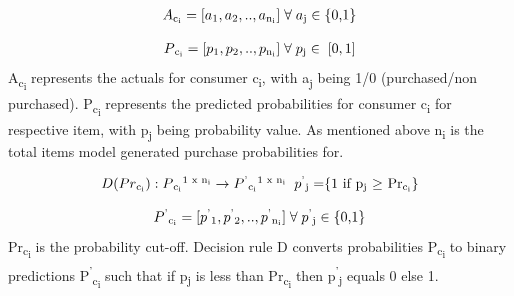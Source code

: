   \begin{equation}
    \begin{array}{l}
      A\textsubscript{c\textsubscript{i}} = [a\textsubscript{1}, a\textsubscript{2}, .., a\textsubscript{n\textsubscript{i}}] 
       \; \forall \; a\textsubscript{j} \in \; $\{0,1\}$
    \end{array}
    \label{eqn:A}
  \end{equation}

  \begin{equation}
    \begin{array}{l}
      P\textsubscript{c\textsubscript{i}} = [p\textsubscript{1}, p\textsubscript{2}, .., p\textsubscript{n\textsubscript{i}}]
      \; \forall \; p\textsubscript{j} \in \; [0,1]
    \end{array}
    \label{eqn:P}
  \end{equation}
A\textsubscript{c\textsubscript{i}} represents the actuals for consumer c\textsubscript{i}, with a\textsubscript{j} being 1/0 
(purchased/non purchased). P\textsubscript{c\textsubscript{i}} represents the predicted probabilities 
for consumer c\textsubscript{i} for respective item, with p\textsubscript{j} being probability value. 
As mentioned above n\textsubscript{i} is the total items model generated purchase probabilities for.

  \begin{equation}
    \begin{array}{l}
      D(Pr\textsubscript{c\textsubscript{i}}) : P\textsubscript{c\textsubscript{i}}\textsuperscript{1 x n\textsubscript{i}}
      \to P\textsuperscript{'}\textsubscript{c\textsubscript{i}}\textsuperscript{1 x n\textsubscript{i}}
      \;\;  p\textsuperscript{'}\textsubscript{j} = $\{1 if p\textsubscript{j} $\geq$ Pr\textsubscript{c\textsubscript{i}}\}$
    \end{array}
    \label{eqn:Decision}
  \end{equation}

  \begin{equation}
    \begin{array}{l}
      P\textsuperscript{'}\textsubscript{c\textsubscript{i}} = [p\textsuperscript{'}\textsubscript{1}, 
      p\textsuperscript{'}\textsubscript{2}, .., p\textsuperscript{'}\textsubscript{n\textsubscript{i}}]\; 
      \forall \; p\textsuperscript{'}\textsubscript{j} \in \; $\{0,1\}$
    \end{array}
    \label{eqn:Pdash}
  \end{equation}
Pr\textsubscript{c\textsubscript{i}} is the probability cut-off.
Decision rule D converts probabilities P\textsubscript{c\textsubscript{i}} to binary predictions 
P\textsuperscript{'}\textsubscript{c\textsubscript{i}} such that if p\textsubscript{j} is less than 
Pr\textsubscript{c\textsubscript{i}} then p\textsuperscript{'}\textsubscript{j} equals 0 else 1. 

